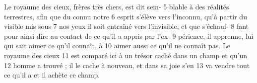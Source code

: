 Le royaume des cieux, frères très chers, est dit sem-	 
5	 	blable à des réalités terrestres, afin que du connu notre	 
6	 	esprit s'élève vers l'inconnu, qu'à partir du visible mis sous	 
7	 	nos yeux il soit entraîné vers l'invisible, et que s'échauf-	 
8	 	fant pour ainsi dire au contact de ce qu'il a appris par l'ex-	 
9	 	périence, il apprenne, lui qui sait aimer ce qu'il connaît, à	 
10	 	aimer aussi ce qu'il ne connaît pas. Le royaume des cieux	 
11	 	est comparé ici à un trésor caché dans un champ et qu'un	 
12	 	homme a trouvé ; il le cache à nouveau, et dans sa joie s'en	 
13	 	va vendre tout ce qu'il a et il achète ce champ.